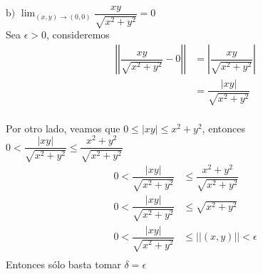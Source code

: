 \documentclass[letterpaper]{article}
\providecommand{\abs}[1]{\left|#1\right|}
\providecommand{\norm}[1]{\left|\left|#1\right|\right|}
\renewcommand{\*}{\cdot}
\theoremstyle{definition}
\begin{document}
$\text{b) }\displaystyle\lim_{(x,y) \to (0,0)} \dfrac{xy }{\sqrt{x^2 + y^2}} = 0$\\
Sea $ \epsilon > 0 $, consideremos 
\begin{align*}
	\norm{\dfrac{xy}{\sqrt{x^2 + y^2}} - 0} &= \abs{\dfrac{xy}{\sqrt{x^2 + y^2}}}\\
	&= \dfrac{\abs{xy}}{\sqrt{x^2 + y^2}}\\
\end{align*}

Por otro lado, veamos que $ 0 \leq \abs{xy} \leq x^2 + y^2 $, entonces $ 0 < \dfrac{\abs{xy}}{\sqrt{x^2 + y^2}} \leq \dfrac{x^2 + y^2}{\sqrt{x^2 + y^2}} $
\begin{align*}
	0 < \dfrac{\abs{xy}}{\sqrt{x^2 + y^2}} &\leq \dfrac{x^2 + y^2}{\sqrt{x^2 + y^2}}\\
	0 < \dfrac{\abs{xy}}{\sqrt{x^2 + y^2}} &\leq \sqrt{x^2 + y^2}\\
	0 < \dfrac{\abs{xy}}{\sqrt{x^2 + y^2}} &\leq \norm{(x,y)} < \epsilon\\
\end{align*}
Entonces sólo basta tomar $ \delta = \epsilon $\\
\end{document}
